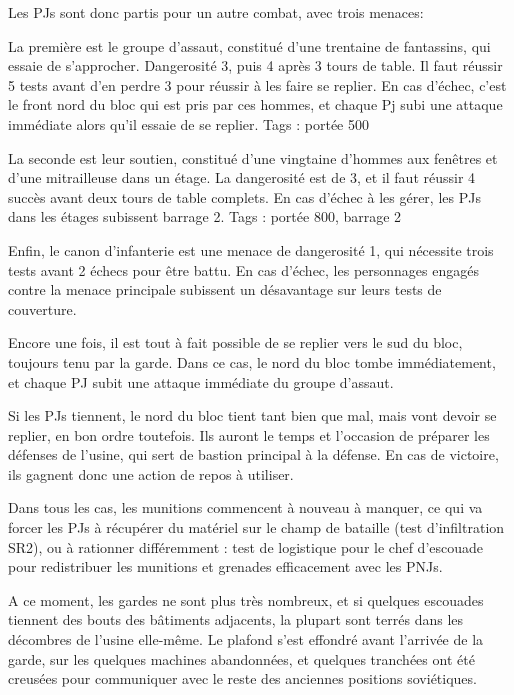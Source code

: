 \documentclass{report}
\begin{document}
\begin{multicols}{2}
Les PJs sont donc partis pour un autre combat, avec trois menaces:

La première est le groupe d'assaut, constitué d'une trentaine de fantassins, qui essaie de s'approcher. Dangerosité 3, puis 4 après 3 tours de table. Il faut réussir 5 tests avant d'en perdre 3 pour réussir à les faire se replier. En cas d'échec, c'est le front nord du bloc qui est pris par ces hommes, et chaque Pj subi une attaque immédiate alors qu'il essaie de se replier. Tags : portée 500

La seconde est leur soutien, constitué d'une vingtaine d'hommes aux fenêtres et d'une mitrailleuse dans un étage. La dangerosité est de 3, et il faut réussir 4 succès avant deux tours de table complets. En cas d'échec à les gérer, les PJs dans les étages subissent barrage 2. Tags : portée 800, barrage 2

Enfin, le canon d'infanterie est une menace de dangerosité 1, qui nécessite trois tests avant 2 échecs pour être battu. En cas d'échec, les personnages engagés contre la menace principale subissent un désavantage sur leurs tests de couverture.

Encore une fois, il est tout à fait possible de se replier vers le sud du bloc, toujours tenu par la garde. Dans ce cas, le nord du bloc tombe immédiatement, et chaque PJ subit une attaque immédiate du groupe d'assaut.

Si les PJs tiennent, le nord du bloc tient tant bien que mal, mais vont devoir se replier, en bon ordre toutefois. Ils auront le temps et l'occasion de préparer les défenses de l'usine, qui sert de bastion principal à la défense. En cas de victoire, ils gagnent donc une action de repos à utiliser.

Dans tous les cas, les munitions commencent à nouveau à manquer, ce qui va forcer les PJs à récupérer du matériel sur le champ de bataille (test d'infiltration SR2), ou à rationner différemment : test de logistique pour le chef d'escouade pour redistribuer les munitions et grenades efficacement avec les PNJs.

A ce moment, les gardes ne sont plus très nombreux, et si quelques escouades tiennent des bouts des bâtiments adjacents, la plupart sont terrés dans les décombres de l'usine elle-même. Le plafond s'est effondré avant l'arrivée de la garde, sur les quelques machines abandonnées, et quelques tranchées ont été creusées pour communiquer avec le reste des anciennes positions soviétiques.



\end{multicols}
\end{document}
